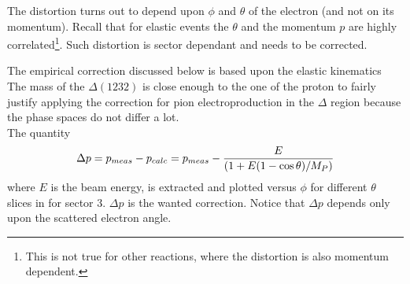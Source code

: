 The distortion turns out to depend upon $\phi$ and $\theta$ of the electron (and not on its momentum).
Recall that for elastic events the $\theta$ and the momentum $p$ are highly correlated\footnote{This is not true for other reactions,
where the distortion is also momentum dependent.}.
Such distortion is sector dependant and needs to be corrected.

The empirical correction discussed below  is based upon the elastic kinematics
The mass of the $\Delta(1232)$ is close enough to the one of the proton to fairly justify applying
the correction for pion electroproduction in the $\Delta$ region because the phase spaces do not differ a lot. \\
The quantity
$$
 \Delta p = p_{meas} - p_{calc} = p_{meas} - \frac{\displaystyle E}{\displaystyle (1+E(1-\cos\theta)/M_P)}
$$
where $E$ is the beam energy, is extracted and plotted versus $\phi$ for different $\theta$ slices  
in  for sector 3. $\Delta p$ is the wanted correction.
Notice that $\Delta p$ depends only upon the scattered electron angle.


